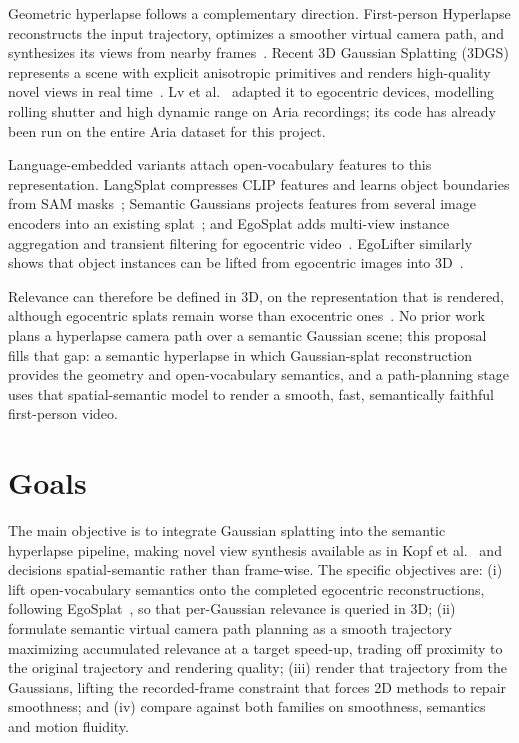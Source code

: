\documentclass[
	mscproposta, %
	english %
]{../ppgccufmg}
\begin{document}
        Geometric hyperlapse follows a complementary direction. First-person Hyperlapse reconstructs the input trajectory, optimizes a smoother virtual camera path, and synthesizes its views from nearby frames~\cite{kopf2014hyperlapse}. Recent 3D Gaussian Splatting (3DGS) represents a scene with explicit anisotropic primitives and renders high-quality novel views in real time~\cite{kerbl2023gaussian}. Lv et al.~\cite{lv2025photoreal} adapted it to egocentric devices, modelling rolling shutter and high dynamic range on Aria recordings; its code has already been run on the entire Aria dataset for this project.

        Language-embedded variants attach open-vocabulary features to this representation. LangSplat compresses CLIP features and learns object boundaries from SAM masks~\cite{qin2024langsplat}; Semantic Gaussians projects features from several image encoders into an existing splat~\cite{guo2024semantic}; and EgoSplat adds multi-view instance aggregation and transient filtering for egocentric video~\cite{li2025egosplat}. EgoLifter similarly shows that object instances can be lifted from egocentric images into 3D~\cite{gu2024egolifter}.

        Relevance can therefore be defined in 3D, on the representation that is rendered, although egocentric splats remain worse than exocentric ones~\cite{warchocki2026personal}. No prior work plans a hyperlapse camera path over a semantic Gaussian scene; this proposal fills that gap: a semantic hyperlapse in which Gaussian-splat reconstruction provides the geometry and open-vocabulary semantics, and a path-planning stage uses that spatial-semantic model to render a smooth, fast, semantically faithful first-person video.
    \section{Goals}
        The main objective is to integrate Gaussian splatting into the semantic hyperlapse pipeline, making novel view synthesis available as in Kopf et al.~\cite{kopf2014hyperlapse} and decisions spatial-semantic rather than frame-wise. The specific objectives are: (i) lift open-vocabulary semantics onto the completed egocentric reconstructions, following EgoSplat~\cite{li2025egosplat}, so that per-Gaussian relevance is queried in 3D; (ii) formulate semantic virtual camera path planning as a smooth trajectory maximizing accumulated relevance at a target speed-up, trading off proximity to the original trajectory and rendering quality; (iii) render that trajectory from the Gaussians, lifting the recorded-frame constraint that forces 2D methods to repair smoothness; and (iv) compare against both families on smoothness, semantics and motion fluidity.
\end{document}
